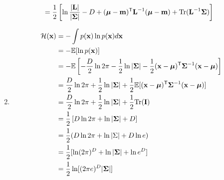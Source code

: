\documentclass{amsmlaj}
\begin{document}
\begin{sol}
\begin{enumerate}
\begin{align}
			&=\frac{1}{2}\left[
				\ln\frac{|\bm{\mathbf{L}}|}{|\bm{\mathbf{\Sigma}}|}-D
				+(\bm{\mathbf{\mu}}-\bm{\mathbf{m}})^{\mathsf{T}}\bm{\mathbf{L}}^{-1}(\bm{\mathbf{\mu}}-\bm{\mathbf{m}})
				+\text{Tr}(\bm{\mathbf{L}}^{-1}\bm{\mathbf{\Sigma}})
			\right]
		\end{align}
		\item \begin{align}
			\mathcal{H}(\bm{\mathbf{x}}) &= - \int {p(\bm{\mathbf{x}})\ln p(\bm{\mathbf{x}})} d\bm{\mathbf{x}}\nonumber \\
			&=-\mathbb{E}[\ln p(\bm{\mathbf{x}})] \\
			&=-\mathbb{E}\left[
				-\frac{D}{2}\ln2\pi
				-\frac{1}{2}\ln|\bm{\mathbf{\Sigma}}|
				-\frac{1}{2}(\bm{\mathbf{x}}-\bm{\mathbf{\mu}})^{\mathsf{T}}\bm{\mathbf{\Sigma}}^{-1}(\bm{\mathbf{x}}-\bm{\mathbf{\mu}})
			\right] \\
			&=\frac{D}{2}\ln2\pi+\frac{1}{2}\ln|\bm{\mathbf{\Sigma}}|
			+\frac{1}{2}\mathbb{E}[(\bm{\mathbf{x}}-\bm{\mathbf{\mu}})^{\mathsf{T}}\bm{\mathbf{\Sigma}}^{-1}(\bm{\mathbf{x}}-\bm{\mathbf{\mu}})] \\
			&=\frac{D}{2}\ln2\pi+\frac{1}{2}\ln|\bm{\mathbf{\Sigma}}|+\frac{1}{2}\text{Tr}(\bm{\mathbf{I}}) \\
			&=\frac{1}{2}\left[ D\ln2\pi+\ln|\bm{\mathbf{\Sigma}}|+D \right] \\
			&=\frac{1}{2}(D\ln2\pi+\ln|\Sigma|+D\ln e) \\
			&=\frac{1}{2}[\ln(2\pi)^D+\ln|\bm{\mathbf{\Sigma}}|+\ln e^D] \\
			&=\frac{1}{2}\ln[(2\pi e)^D |\bm{\mathbf{\Sigma}}|]
		\end{align}
	\end{enumerate}
\end{sol}
\end{document}
